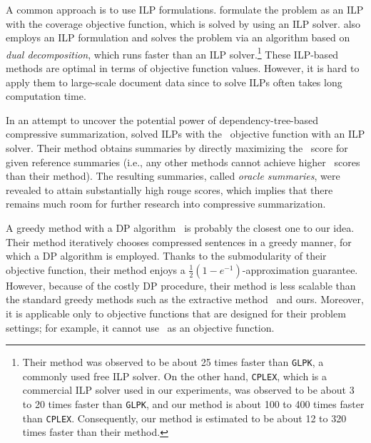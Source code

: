 \documentclass[11pt,a4paper]{article}
\begin{document}
	A common approach is to use ILP formulations. 
	\citet{berg2011jointly} 
	formulate the problem as an ILP 
	with the coverage objective function,  
	which is solved by using an ILP solver.  
	\citet{almeida2013fast} also employs an ILP formulation  
	and solves the problem via an algorithm based on 
	{\it dual decomposition}, 
	which runs faster than an ILP 
	solver.\footnote{Their method was observed to be about 25 
		times faster than {\tt GLPK}, a commonly used free ILP solver. 
		On the other hand, {\tt CPLEX}, 
		which is a commercial ILP solver used in our experiments, 
		was observed to be about 3 to 20 times faster than {\tt GLPK}, 
		and our method is  
		about 100 to 400 times faster than {\tt CPLEX}. 
		Consequently, our method is estimated to be about 
		12 to 320 times faster than their method.}
	These ILP-based methods are optimal in terms of objective function values.  
	However, it is hard to apply them to large-scale document data since to solve ILPs often takes long computation time. 
	
	In an attempt to uncover the potential power of dependency-tree-based compressive summarization, 	
	\citet{hirao2017oracle} 
	solved ILPs with the \rouge\ objective function with an ILP solver.  
	Their method obtains 
	summaries by directly maximizing 
	the \rouge\ score for given reference summaries 
	(i.e., any other methods cannot achieve higher \rouge\ scores than their method).   
	The resulting summaries, called {\it oracle summaries},  
	were revealed to attain substantially high rouge scores, 
	which implies that there remains much room for further research into compressive summarization.
	
	
	A greedy method with a DP %
	algorithm~\cite{morita2013subtree} is 
	probably the closest one to our idea. 
	Their method iteratively chooses compressed sentences 
	in a greedy manner,  
	for which a DP algorithm is employed.  
	Thanks to the submodularity of their objective function, 
	their method enjoys a $\frac{1}{2}(1-e^{-1})$-approximation 
	guarantee. 
	However, 
	because of the costly DP procedure, 
	their method is less scalable than the standard greedy methods  
	such as the extractive method~\cite{lin2010multi} 
	and ours. 
	Moreover, it is applicable only to objective functions that 
	are designed for their problem settings; 
	for example, it cannot use \rouge\ as an objective function. 
	
\end{document}
